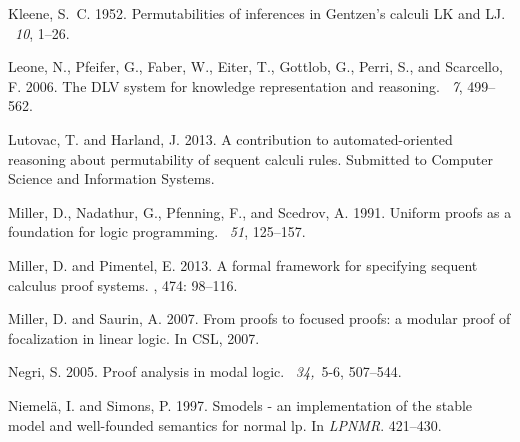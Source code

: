 \documentclass{new_tlp}
\begin{document}
\begin{thebibliography}{}
{\sc Kleene, S.~C.} 1952.
\newblock Permutabilities of inferences in {Gentzen's} calculi {LK} and {LJ}.
~{\em 10}, 1--26.

{\sc Leone, N.}, {\sc Pfeifer, G.}, {\sc Faber, W.}, {\sc Eiter, T.}, {\sc
  Gottlob, G.}, {\sc Perri, S.}, {\sc and} {\sc Scarcello, F.} 2006.
\newblock The {DLV} system for knowledge representation and reasoning.
~{\em 7}, 499--562.

{\sc Lutovac, T.} {\sc and} {\sc Harland, J.} 2013.
\newblock A contribution to automated-oriented reasoning about permutability of
  sequent calculi rules.
\newblock Submitted to Computer Science and Information Systems.

{\sc Miller, D.}, {\sc Nadathur, G.}, {\sc Pfenning, F.}, {\sc and} {\sc
  Scedrov, A.} 1991.
\newblock Uniform proofs as a foundation for logic programming.
~{\em 51}, 125--157.

{\sc Miller, D.} {\sc and} {\sc Pimentel, E.} 2013.
\newblock A formal framework for specifying sequent calculus proof systems.
, 474: 98--116.

{\sc Miller, D.} {\sc and} {\sc Saurin, A.} 2007.
\newblock From proofs to focused proofs: a modular proof of focalization in
  linear logic.
\newblock In {CSL}, 2007.

{\sc Negri, S.} 2005.
\newblock Proof analysis in modal logic.
~{\em 34,\/}~5-6, 507--544.

{\sc Niemel{\"a}, I.} {\sc and} {\sc Simons, P.} 1997.
\newblock Smodels - an implementation of the stable model and well-founded
  semantics for normal lp.
\newblock In {\em LPNMR}. 421--430.


\end{thebibliography}
\end{document}
